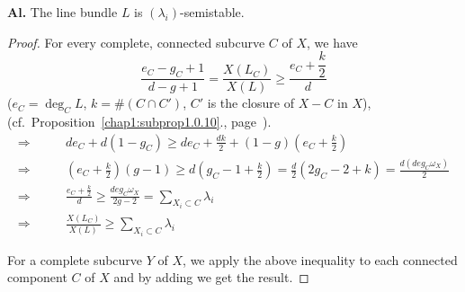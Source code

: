 \begin{prop*}
{\rm \textbf{Al.}}
The line bundle $L$ is $(\lambda_i)$-semistable.
\end{prop*}

\begin{proof}
For every complete, connected subcurve $C$ of $X$, we have
$$
\frac{e_C-g_C+1}{d-g+1} = \frac{X(L_C)}{X(L)} \ge \frac{e_C
  +\dfrac{k}{2}}{d} 
$$
($e_C=\deg_C L$, $k= \# (C \cap C')$,  $C'$ is the closure of $X-C$ in $X$),
(cf.\ Proposition~\ref{chap1:subprop1.0.10}., page~\pageref{chap1:subprop1.0.10}).  
{\fontsize{10}{12}\selectfont
\begin{align*}
\Rightarrow & \qquad de_C+d(1-g_C)\ge de_C + \frac{dk}{2}+(1-g)
(e_C+\frac{k}{2})\\ 
\Rightarrow &  \qquad(e_C+\frac{k}{2})(g-1) \ge d(g_C -1+\frac{k}{2})
=\frac{d}{2}(2g_C -2+k)=\frac{d(deg_C \omega_X)}{2} \\
\Rightarrow & \qquad \frac{e_C+\frac{k}{2}}{d} \ge \frac{deg_C
  \omega_X}{2g-2}= \sum\limits_{X_i \subset C}\lambda_i\\  
\Rightarrow &  \qquad \frac{X(L_C)}{X(L)} \ge  \sum_{X_i \subset C}
\lambda_i 
\end{align*}}\relax\pageoriginale

For a complete subcurve $Y$ of $X$, we apply the above inequality to
each connected component $C$ of $X$ and by adding we get the result. 
\end{proof}

